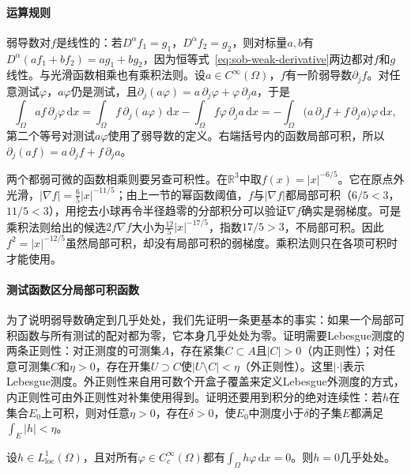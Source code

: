 \paragraph{运算规则}
弱导数对$f$是线性的：若$D^\alpha f_1=g_1$，$D^\alpha f_2=g_2$，则对标量$a,b$有$D^\alpha(af_1+bf_2)=ag_1+bg_2$，因为恒等式~\eqref{eq:sob-weak-derivative}两边都对$f$和$g$线性。与光滑函数相乘也有乘积法则。设$a\in C^\infty(\Omega)$，$f$有一阶弱导数$\partial_jf$。对任意测试$\varphi$，$a\varphi$仍是测试，且$\partial_j(a\varphi)=a\,\partial_j\varphi+\varphi\,\partial_ja$，于是
\[
 \int_\Omega af\,\partial_j\varphi\,\mathrm dx
 =\int_\Omega f\,\partial_j(a\varphi)\,\mathrm dx-\int_\Omega f\varphi\,\partial_ja\,\mathrm dx
 =-\int_\Omega\bigl(a\,\partial_jf+f\,\partial_ja\bigr)\varphi\,\mathrm dx ,
\]
第二个等号对测试$a\varphi$使用了弱导数的定义。右端括号内的函数局部可积，所以$\partial_j(af)=a\,\partial_jf+f\,\partial_ja$。

两个都弱可微的函数相乘则要另查可积性。在$\mathbb R^3$中取$f(x)=|x|^{-6/5}$。它在原点外光滑，$|\nabla f|=\frac65|x|^{-11/5}$；由上一节的幂函数阈值，$f$与$|\nabla f|$都局部可积（$6/5<3$，$11/5<3$），用挖去小球再令半径趋零的分部积分可以验证$\nabla f$确实是弱梯度。可是乘积法则给出的候选$2f\nabla f$大小为$\frac{12}{5}|x|^{-17/5}$，指数$17/5>3$，不局部可积。因此$f^2=|x|^{-12/5}$虽然局部可积，却没有局部可积的弱梯度。乘积法则只在各项可积时才能使用。

\paragraph{测试函数区分局部可积函数}
为了说明弱导数确定到几乎处处，我们先证明一条更基本的事实：如果一个局部可积函数与所有测试的配对都为零，它本身几乎处处为零。证明需要Lebesgue测度的两条正则性：对正测度的可测集$A$，存在紧集$C\subset A$且$|C|>0$（内正则性）；对任意可测集$C$和$\eta>0$，存在开集$U\supset C$使$|U\setminus C|<\eta$（外正则性）。这里$|\cdot|$表示Lebesgue测度。外正则性来自用可数个开盒子覆盖来定义Lebesgue外测度的方式，内正则性可由外正则性对补集使用得到。证明还要用到积分的绝对连续性：若$h$在集合$E_0$上可积，则对任意$\eta>0$，存在$\delta>0$，使$E_0$中测度小于$\delta$的子集$E$都满足$\int_E|h|<\eta$。

\begin{lemma}[测试函数区分局部可积函数]
\label{lem:sob-fundamental}
设$h\in L^1_{\mathrm{loc}}(\Omega)$，且对所有$\varphi\in C_c^\infty(\Omega)$都有$\int_\Omega h\varphi\,\mathrm dx=0$。则$h=0$几乎处处。
\end{lemma}

